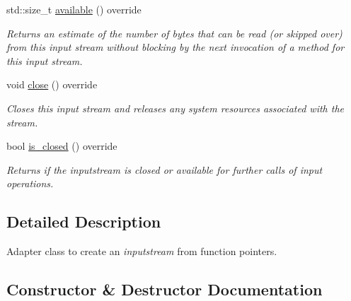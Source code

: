\begin{DoxyCompactItemize}
std\+::size\+\_\+t \hyperlink{structdevfix_1_1base_1_1io_1_1source_a911f4ba79499a623de30cf16d3d26d47}{available} () override
\begin{DoxyCompactList}\small\item\em Returns an estimate of the number of bytes that can be read (or skipped over) from this input stream without blocking by the next invocation of a method for this input stream. \end{DoxyCompactList}\item 
void \hyperlink{structdevfix_1_1base_1_1io_1_1source_aa00a381c8a166cbbc5dbf6de4b56590e}{close} () override
\begin{DoxyCompactList}\small\item\em Closes this input stream and releases any system resources associated with the stream. \end{DoxyCompactList}\item 
bool \hyperlink{structdevfix_1_1base_1_1io_1_1source_a406834cf6651d48949b96d0ef49cc6c1}{is\+\_\+closed} () override
\begin{DoxyCompactList}\small\item\em Returns if the {\itshape inputstream} is closed or available for further calls of input operations. \end{DoxyCompactList}\end{DoxyCompactItemize}


\subsection{Detailed Description}
Adapter class to create an {\itshape inputstream} from function pointers. 

\subsection{Constructor \& Destructor Documentation}
\mbox{\label{structdevfix_1_1base_1_1io_1_1source_af8bef20f5b54153c3fd1fbc7daa263c5}} 
